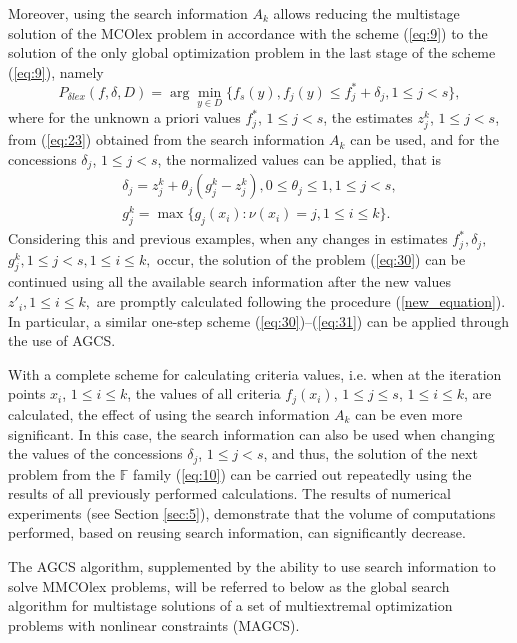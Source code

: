 \documentclass[smallextended]{svjour3}       %
\begin{document}
Moreover, using the search information $A_k$ allows reducing the multistage solution of the MCOlex problem in accordance with the scheme (\ref{eq:9}) to the solution of the only global optimization problem in the last stage of the scheme (\ref{eq:9}), namely
\begin{equation}\label{eq:30}
P_{\delta lex} (f,\delta,D)=\arg \min_{y \in D} { \{ f_s(y), f_j(y)\leq f_j^* + \delta_j, 1 \leq j < s\} },
\end{equation}
where for the unknown a priori values $f_j^*$, $1 \leq j < s$, the estimates $z_j^k$, ${1 \leq j < s}$, from (\ref{eq:23}) obtained from the search information $A_k$ can be used, and for the concessions $\delta_j$, $1 \leq j < s$, the normalized values can be applied, that is
\begin{equation}\label{eq:31}
	\begin{matrix}
	\delta_j = z_j^k + \theta_j (g_j^k-z_j^k ), 0 \leq \theta_j \leq 1, 1 \leq j < s,\\
	g_j^k = \max{\{ g_j (x_i ) : \nu(x_i)=j, 1 \leq i \leq k \}}.
	\end{matrix}
\end{equation}
Considering this and previous examples, when any changes in estimates $f_j^*, \delta_j,$ $g_j^k, 1\leq j < s, 1 \leq i \leq k,$ occur, the solution of the problem (\ref{eq:30}) can be continued using all the available search information after the new values $z'_i,1\leq i \leq k,$ are promptly calculated following the procedure (\ref{new_equation}).
In particular, a similar one-step scheme (\ref{eq:30})--(\ref{eq:31}) can be applied through the use of AGCS.

With a complete scheme for calculating criteria values, i.e. when at the iteration points $x_i$, $1 \leq i \leq k$, the values of all criteria $f_j(x_i)$, $1 \leq j \leq s$, $1 \leq i \leq k$, are calculated, the effect of using the search information $A_k$ can be even more significant. In this case, the search information can also be used when changing the values of the concessions $\delta_j$, $1 \leq j < s$, and thus, the solution of the next problem from the $\mathbb{F}$ family (\ref{eq:10}) can be carried out repeatedly using the results of all previously performed calculations. The results of numerical experiments (see Section \ref{sec:5}), demonstrate that the volume of computations performed, based on reusing search information, can significantly decrease.

The AGCS algorithm, supplemented by the ability to use search information to solve MMCOlex problems, will be referred to below as the global search algorithm for multistage solutions of a set of multiextremal optimization problems with nonlinear constraints (MAGCS).
\end{document}
